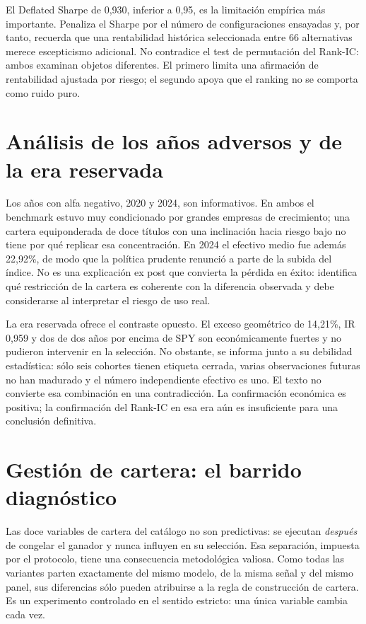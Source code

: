 El Deflated Sharpe de 0,930, inferior a 0,95, es la limitación empírica más importante. Penaliza el
Sharpe por el número de configuraciones ensayadas y, por tanto, recuerda que una rentabilidad
histórica seleccionada entre 66 alternativas merece escepticismo adicional. No contradice el test de
permutación del Rank-IC: ambos examinan objetos diferentes. El primero limita una afirmación de
rentabilidad ajustada por riesgo; el segundo apoya que el ranking no se comporta como ruido puro.

\section{Análisis de los años adversos y de la era reservada}

Los años con alfa negativo, 2020 y 2024, son informativos. En ambos el benchmark estuvo muy
condicionado por grandes empresas de crecimiento; una cartera equiponderada de doce títulos con una
inclinación hacia riesgo bajo no tiene por qué replicar esa concentración. En 2024 el efectivo medio
fue además 22,92\%, de modo que la política prudente renunció a parte de la subida del índice. No es
una explicación ex post que convierta la pérdida en éxito: identifica qué restricción de la cartera
es coherente con la diferencia observada y debe considerarse al interpretar el riesgo de uso real.

La era reservada ofrece el contraste opuesto. El exceso geométrico de 14,21\%, IR 0,959 y dos de dos
años por encima de SPY son económicamente fuertes y no pudieron intervenir en la selección. No
obstante, se informa junto a su debilidad estadística: sólo seis cohortes tienen etiqueta cerrada,
varias observaciones futuras no han madurado y el número independiente efectivo es uno. El texto no
convierte esa combinación en una contradicción. La confirmación económica es positiva; la
confirmación del Rank-IC en esa era aún es insuficiente para una conclusión definitiva.

\section{Gestión de cartera: el barrido diagnóstico}
\label{sec:cartera-barrido}

Las doce variables de cartera del catálogo no son predictivas: se ejecutan \emph{después} de
congelar el ganador y nunca influyen en su selección. Esa separación, impuesta por el protocolo,
tiene una consecuencia metodológica valiosa. Como todas las variantes parten exactamente del mismo
modelo, de la misma señal y del mismo panel, sus diferencias sólo pueden atribuirse a la regla de
construcción de cartera. Es un experimento controlado en el sentido estricto: una única variable
cambia cada vez.

